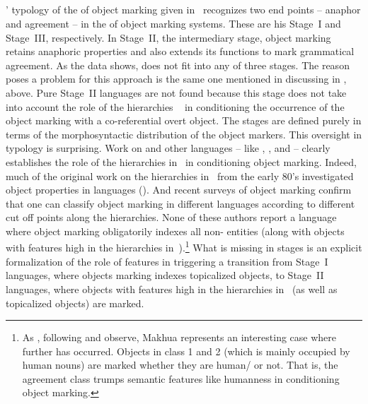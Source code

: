 \documentclass[output=paper]{LSP/langsci}
\begin{document}
\subsection{\citet{Creissels2006Typology}}
\label{Downing-Creissels}
' typology of the 
of object marking given in~ recognizes two end points – anaphor and agreement – in the  of object marking systems. 
These are his Stage~I and
Stage~III, respectively. In Stage~II, the intermediary stage, object
marking retains anaphoric properties and also extends its functions to
mark grammatical agreement. As the data shows,  does not fit
into any of  three stages. The reason
 poses a problem for this approach is the same one mentioned
in discussing  in ,
above. Pure Stage~II  languages are not found because this stage
does not take into account the role of the  hierarchies
~ in conditioning the occurrence of the object
marking with a co-referential overt object. The stages are defined
purely in terms of the morphosyntactic distribution of the object
markers. This oversight in  typology
is surprising. Work on  and other languages – like
\citet{Duranti1979Object, Bentley1994Syntactic,
 Morimoto2002Prominence, Aissen2003Differential},
\citet{Riedel2009Syntax}, \citet{Martenetal2012Object} and
\citet{vanderWal2015Bantu} – clearly establishes the role of the
hierarchies in~ in conditioning object
marking. Indeed, much of the original work on the hierarchies
in~ from the early 80’s investigated object
properties in  languages (\eg \citealt{Hymanetal1974Hierarchies,Duranti1979Object,Hymanetal1982Bantu}). 
And recent surveys of  object marking \citep{Morimoto2002Prominence,
 Riedel2009Syntax, Martenetal2012Object, vanderWal2015Bantu} confirm
that one can classify object marking in different  languages
according to different cut off points along the 
hierarchies. 
None of these authors report a  language where
object marking obligatorily indexes all  non-
entities (along with objects with features high in the hierarchies
in~).\footnote{As \citet{Martenetal2012Object},
 following \citet{Stucky1981Word} and \citet{vanderWal2009Word}
 observe, Makhua represents an interesting case where further
  has occurred. 
 Objects in class 1 and 2 (which is
 mainly occupied by human nouns) are marked whether they are
 human/ or not. That is, the agreement class trumps semantic
 features like humanness in conditioning object marking.} What is
missing in   stages
is an explicit formalization of the role of  features in
triggering a transition from Stage~I languages, where objects marking
indexes topicalized objects, to Stage~II languages, where objects with
features high in the hierarchies in~ (as well
as topicalized objects) are marked.
\end{document}
